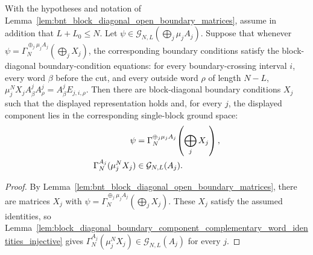 \begin{lemma}
    \label{lem:block_diagonal_boundary_periodic_components_from_complementary_identities}
    \leanok
    With the hypotheses and notation of
    Lemma~\ref{lem:bnt_block_diagonal_open_boundary_matrices}, assume in
    addition that $L+L_0\le N$. Let
    $\psi\in\mathcal G_{N,L}(\bigoplus_j\mu_jA_j)$. Suppose that whenever
    $\psi=\Gamma_N^{\oplus_j\mu_jA_j}(\bigoplus_jX_j)$, the corresponding
    boundary conditions satisfy the block-diagonal boundary-condition
    equations: for every boundary-crossing interval $i$, every word $\beta$
    before the cut, and every outside word $\rho$ of length $N-L$,
    $\mu_j^N X_jA^j_\beta A^j_\rho = A^j_\beta E_{j,i,\rho}$.
    Then there are block-diagonal boundary conditions $X_j$ such that the displayed
    representation holds and, for every $j$, the displayed component lies in
    the corresponding single-block ground space:
    \begin{align}
        \psi
         & =
        \Gamma_N^{\oplus_j\mu_jA_j}\!\left(\bigoplus_jX_j\right),
        \notag                       \\
        \Gamma_N^{A_j}(\mu_j^NX_j)
         & \in\mathcal G_{N,L}(A_j).
        \notag
    \end{align}
\end{lemma}

\begin{proof}
    \leanok
    By Lemma~\ref{lem:bnt_block_diagonal_open_boundary_matrices}, there are
    matrices $X_j$ with
    $\psi=\Gamma_N^{\oplus_j\mu_jA_j}(\bigoplus_jX_j)$.
    These $X_j$ satisfy the assumed identities, so
    Lemma~\ref{lem:block_diagonal_boundary_component_complementary_word_identities_injective}
    gives $\Gamma_N^{A_j}(\mu_j^NX_j)\in\mathcal G_{N,L}(A_j)$ for every $j$.
\end{proof}

